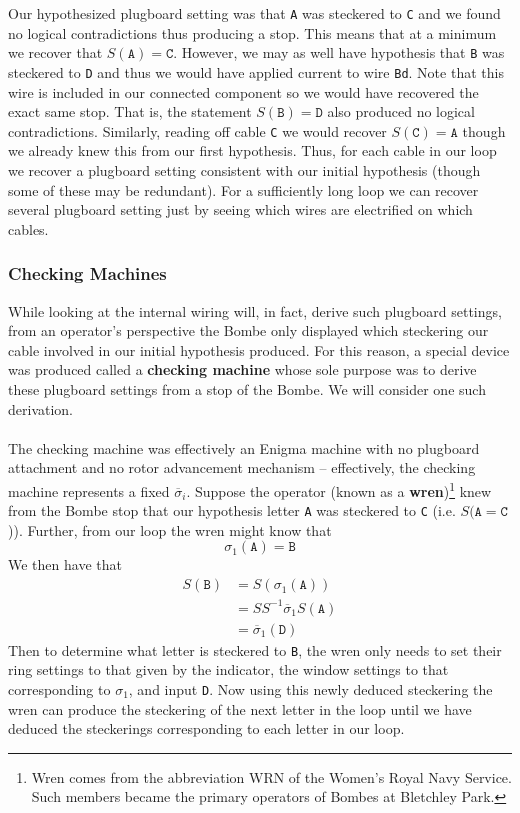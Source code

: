 Our hypothesized plugboard setting was that \texttt{A} was steckered
to \texttt{C} and we found no logical contradictions thus producing a
stop. This means that at a minimum we recover that $S(\texttt{A}) =
\texttt{C}$. However, we may as well have hypothesis that \texttt{B}
was steckered to \texttt{D} and thus we would have applied current to
wire \texttt{Bd}. Note that this wire is included in our connected
component so we would have recovered the exact same stop. That is,
the statement $S(\texttt{B}) = \texttt{D}$ also produced no logical
contradictions. Similarly, reading off cable \texttt{C} we would
recover $S(\texttt{C}) = \texttt{A}$ though we already knew this from
our first hypothesis. Thus, for each cable in our loop we recover a
plugboard setting consistent with our initial hypothesis (though some
of these may be redundant). For a sufficiently long loop we can
recover several plugboard setting just by seeing which wires are
electrified on which cables.
\subsubsection{Checking Machines}
While looking at the internal wiring will, in fact, derive such
plugboard settings, from an operator's perspective the Bombe only
displayed which steckering our cable involved in our initial
hypothesis produced. For this reason, a special device was produced
called a {\bf{checking machine}} whose sole purpose was to derive
these plugboard settings from a stop of the Bombe. We will consider
one such derivation.
\\\\The checking machine was effectively an Enigma machine with no
plugboard attachment and no rotor advancement mechanism --
effectively, the checking machine represents a fixed
$\overline\sigma_i$. Suppose the operator (known as a
{\bf{wren}})\footnote{Wren comes from the abbreviation WRN of the
  Women's Royal Navy Service. Such members became the primary operators
of Bombes at Bletchley Park.} knew from the Bombe stop that our
hypothesis letter \texttt{A} was steckered to \texttt{C} (i.e.
$S(\texttt{A} = \texttt{C}$)). Further, from our loop the wren might know that
\[
  \sigma_1(\texttt{A}) = \texttt{B}
\]
We then have that
\begin{align*}
  S(\texttt{B}) & = S(\sigma_1(\texttt{A}))                \\
  & = SS^{-1}\overline\sigma_1 S(\texttt{A}) \\
  & = \overline\sigma_1(\texttt{D})
\end{align*}
Then to determine what letter is steckered to \texttt{B}, the wren
only needs to set their ring settings to that given by the indicator,
the window settings to that corresponding to $\sigma_1$, and input
\texttt{D}. Now using this newly deduced steckering the wren can
produce the steckering of the next letter in the loop until we have
deduced the steckerings corresponding to each letter in our loop.

